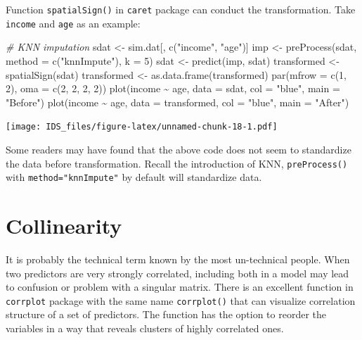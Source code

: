 \documentclass[
  12pt,
]{krantz}
\makeatletter
\newenvironment{Shaded}{\begin{snugshade}}{\end{snugshade}}
\newcommand{\AttributeTok}[1]{\textcolor[rgb]{0.61,0.61,0.61}{#1}}
\newcommand{\CommentTok}[1]{\textcolor[rgb]{0.37,0.37,0.37}{\textit{#1}}}
\newcommand{\DecValTok}[1]{\textcolor[rgb]{0.06,0.06,0.06}{#1}}
\newcommand{\FunctionTok}[1]{\textcolor[rgb]{0,0,0}{#1}}
\newcommand{\NormalTok}[1]{#1}
\newcommand{\OtherTok}[1]{\textcolor[rgb]{0.37,0.37,0.37}{#1}}
\newcommand{\SpecialCharTok}[1]{\textcolor[rgb]{0,0,0}{#1}}
\newcommand{\StringTok}[1]{\textcolor[rgb]{0.5,0.5,0.5}{#1}}
\newenvironment{kframe}{%
\medskip{}
\setlength{\fboxsep}{.8em}
 \def\at@end@of@kframe{}%
 \ifinner\ifhmode%
  \def\at@end@of@kframe{\end{minipage}}%
  \begin{minipage}{\columnwidth}%
 \fi\fi%
 \def\FrameCommand##1{\hskip\@totalleftmargin \hskip-\fboxsep
 \colorbox{shadecolor}{##1}\hskip-\fboxsep
     \hskip-\linewidth \hskip-\@totalleftmargin \hskip\columnwidth}%
 \MakeFramed {\advance\hsize-\width
   \@totalleftmargin\z@ \linewidth\hsize
   \@setminipage}}%
 {\par\unskip\endMakeFramed%
 \at@end@of@kframe}
\renewenvironment{Shaded}{\begin{kframe}}{\end{kframe}}
\makeatother
\begin{document}
Function \texttt{spatialSign()} in \texttt{caret} package can conduct the transformation. Take \texttt{income} and \texttt{age} as an example:

\begin{Shaded}
\begin{Highlighting}[]
\CommentTok{\# KNN imputation}
\NormalTok{sdat }\OtherTok{\textless{}{-}}\NormalTok{ sim.dat[, }\FunctionTok{c}\NormalTok{(}\StringTok{"income"}\NormalTok{, }\StringTok{"age"}\NormalTok{)]}
\NormalTok{imp }\OtherTok{\textless{}{-}} \FunctionTok{preProcess}\NormalTok{(sdat, }\AttributeTok{method =} \FunctionTok{c}\NormalTok{(}\StringTok{"knnImpute"}\NormalTok{), }\AttributeTok{k =} \DecValTok{5}\NormalTok{)}
\NormalTok{sdat }\OtherTok{\textless{}{-}} \FunctionTok{predict}\NormalTok{(imp, sdat)}
\NormalTok{transformed }\OtherTok{\textless{}{-}} \FunctionTok{spatialSign}\NormalTok{(sdat)}
\NormalTok{transformed }\OtherTok{\textless{}{-}} \FunctionTok{as.data.frame}\NormalTok{(transformed)}
\FunctionTok{par}\NormalTok{(}\AttributeTok{mfrow =} \FunctionTok{c}\NormalTok{(}\DecValTok{1}\NormalTok{, }\DecValTok{2}\NormalTok{), }\AttributeTok{oma =} \FunctionTok{c}\NormalTok{(}\DecValTok{2}\NormalTok{, }\DecValTok{2}\NormalTok{, }\DecValTok{2}\NormalTok{, }\DecValTok{2}\NormalTok{))}
\FunctionTok{plot}\NormalTok{(income }\SpecialCharTok{\textasciitilde{}}\NormalTok{ age, }\AttributeTok{data =}\NormalTok{ sdat, }\AttributeTok{col =} \StringTok{"blue"}\NormalTok{, }\AttributeTok{main =} \StringTok{"Before"}\NormalTok{)}
\FunctionTok{plot}\NormalTok{(income }\SpecialCharTok{\textasciitilde{}}\NormalTok{ age, }\AttributeTok{data =}\NormalTok{ transformed, }\AttributeTok{col =} \StringTok{"blue"}\NormalTok{, }\AttributeTok{main =} \StringTok{"After"}\NormalTok{)}
\end{Highlighting}
\end{Shaded}

\texttt{[image: IDS\_files/figure-latex/unnamed-chunk-18-1.pdf]}

Some readers may have found that the above code does not seem to standardize the data before transformation. Recall the introduction of KNN, \texttt{preProcess()} with \texttt{method="knnImpute"} by default will standardize data.

\hypertarget{collinearity}{%
\section{Collinearity}\label{collinearity}}

It is probably the technical term known by the most un-technical people. When two predictors are very strongly correlated, including both in a model may lead to confusion or problem with a singular matrix. There is an excellent function in \texttt{corrplot} package with the same name \texttt{corrplot()} that can visualize correlation structure of a set of predictors. The function has the option to reorder the variables in a way that reveals clusters of highly correlated ones.
\end{document}
